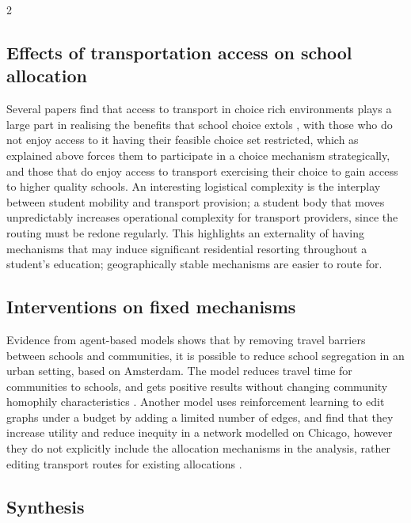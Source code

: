 \documentclass{article}
\begin{document}
\begin{multicols}{2}
\subsection{Effects of transportation access on school allocation}
Several papers find that access to transport in choice rich environments plays a large part in realising the benefits that school choice extols \cite{sattin-bajajStudentTransportationChoiceRich2023,trajkovskiSchoolBusesMake2021,cordesDoesPupilTransportation2018}, with those who do not enjoy access to it having their feasible choice set restricted, which as explained above forces them to participate in a choice mechanism strategically, and those that do enjoy access to transport exercising their choice to gain access to higher quality schools. An interesting logistical complexity is the interplay between student mobility and transport provision; a student body that moves unpredictably increases operational complexity for transport providers, since the routing must be redone regularly. This highlights an externality of having mechanisms that may induce significant residential resorting throughout a student's education; geographically stable mechanisms are easier to route for.

\subsection{Interventions on fixed mechanisms}
Evidence from agent-based models shows that by removing travel barriers between schools and communities, it is possible to reduce school segregation in an urban setting, based on Amsterdam. The model reduces travel time for communities to schools, and gets positive results without changing community homophily characteristics \cite{michailidisTacklingSchoolSegregation2024}. Another model uses reinforcement learning to edit graphs under a budget by adding a limited number of edges, and find that they increase utility and reduce inequity in a network modelled on Chicago, however they do not explicitly include the allocation mechanisms in the analysis, rather editing transport routes for existing allocations \cite{ramachandranGAEAGraphAugmentation2021}.


\subsection{Synthesis}


\end{multicols}
\end{document}
